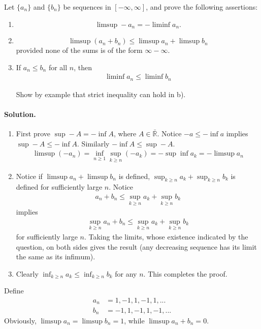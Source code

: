 \documentclass[../main.tex]{subfiles}
\begin{document}
\begin{exercise}
  Let $ \{a_n\} $ and $ \{b_n\} $ be sequences in $ [-\infty, \infty] $, and prove the following assertions:
  \begin{enumerate}
    \item $$ \limsup -a_n = -\liminf a_n. $$
    \item $$ \limsup (a_n + b_n) \le \limsup a_n + \limsup b_n $$ provided none of the sums is of the form $ \infty - \infty $.
    \item If $ a_n \le b_n $ for all $ n $, then
    \begin{align*}
      \liminf a_n \le \liminf b_n
    \end{align*}

    Show by example that strict inequality can hold in b).


  \end{enumerate}
  \paragraph{Solution. }
  \begin{enumerate}
    \item First prove $ \sup -A = - \inf A $, where $ A \in \mathbb{\bar R} $. Notice $ -a \le -\inf a $ implies $ \sup -A \le -\inf A $. Similarly $ -\inf A \le \sup -A $.
    \begin{align*}
      \limsup (-a_n) = \inf _{n \ge 1} \sup _{k \ge n} (-a_k) = - \sup \inf a_k = -\limsup a_n
    \end{align*}

    \item Notice if $ \limsup a_n + \limsup b_n $ is defined, $ \sup _{k \ge n} a_k + \sup _{k \ge n} b_k $ is defined for sufficiently large $ n $. Notice
    \begin{align*}
      a_n + b_n \le \sup _{k \ge n} a_k + \sup _{k \ge n} b_k
    \end{align*}
    implies
    \begin{align*}
      \sup _{k \ge n} a_n + b_n \le \sup _{k \ge n} a_k + \sup _{k \ge n} b_k
    \end{align*}
    for sufficiently large $ n $. Taking the limits, whose existence indicated by the question, on both sides gives the result (any decreasing sequence has its limit the same as its infimum).

    \item Clearly $ \inf _{k \ge n} a_k \le \inf _{k \ge n} b_k $ for any $ n $. This completes the proof.
  \end{enumerate}

  Define
  \begin{align*}
    a_n &= 1, -1, 1, -1, 1, ...\\
    b_n &= -1, 1, -1, 1, -1, ...
  \end{align*}
  Obviously, $ \limsup a_n = \limsup b_n = 1 $, while $ \limsup a_n + b_n = 0 $.
\end{exercise}
\end{document}
